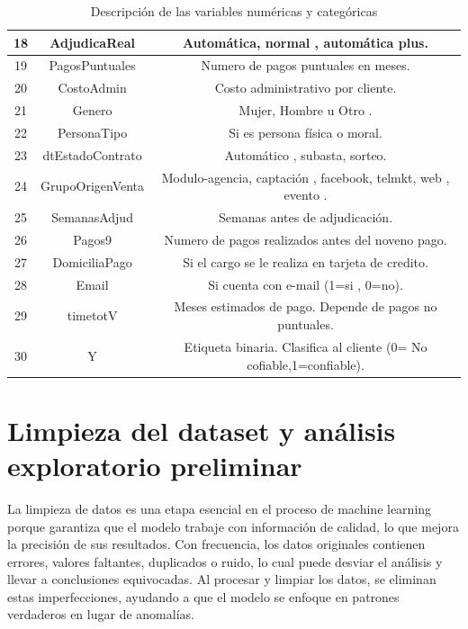 \begin{table}[H]
\begin{tabular}{|c|c|c|}
        \hline
        18 &  AdjudicaReal &  Automática, normal , automática plus.\\
        \hline
        19 &  PagosPuntuales &      Numero de pagos puntuales en meses.  \\
        \hline
        20 &  CostoAdmin &    Costo administrativo por cliente. \\
        \hline
        21 &  Genero &       Mujer, Hombre u Otro . \\
        \hline
        22 &  PersonaTipo &   Si es persona física o moral. \\
        \hline
        23 &  dtEstadoContrato &    Automático , subasta, sorteo. \\
        \hline
        24 &  GrupoOrigenVenta &    Modulo-agencia, captación , facebook, telmkt, web , evento .\\
        \hline
        25 &  SemanasAdjud &    Semanas antes de adjudicación.  \\
        \hline
        26 &  Pagos9 &    Numero de pagos realizados antes del noveno pago. \\
        \hline
        27 &  DomiciliaPago &   Si el cargo se le realiza en tarjeta de credito. \\
        \hline
        28 &  Email &      Si cuenta con e-mail (1=si , 0=no). \\
        \hline
        29 &  timetotV &  Meses estimados de pago. Depende de pagos no puntuales. \\
        \hline
        30 &  Y &  Etiqueta binaria. Clasifica al cliente (0= No cofiable,1=confiable). \\
        \hline  
    \end{tabular}
    \caption{Descripción de las variables numéricas y categóricas}
\end{table} \medskip
\section{Limpieza del dataset y análisis exploratorio preliminar}

La limpieza de datos es una etapa esencial en el proceso de machine learning porque garantiza 
que el modelo trabaje con información de calidad, lo que mejora la precisión de sus resultados. 
Con frecuencia, los datos originales contienen errores, valores faltantes, duplicados o ruido, 
lo cual puede desviar el análisis y llevar a conclusiones equivocadas. Al procesar y limpiar los 
datos, se eliminan estas imperfecciones, ayudando a que el modelo se enfoque en patrones verdaderos
en lugar de anomalías. \medskip

